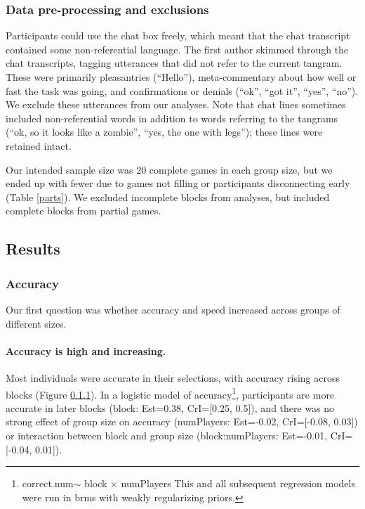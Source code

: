 \documentclass[
  english,
  a4paper,
]{article}
\begin{document}
\hypertarget{data-pre-processing-and-exclusions}{%
\subsubsection{Data pre-processing and exclusions}\label{data-pre-processing-and-exclusions}}

Participants could use the chat box freely, which meant that the chat transcript contained some non-referential language. The first author skimmed through the chat transcripts, tagging utterances that did not refer to the current tangram. These were primarily pleasantries (``Hello''), meta-commentary about how well or fast the task was going, and confirmations or denials (``ok'', ``got it'', ``yes'', ``no''). We exclude these utterances from our analyses. Note that chat lines sometimes included non-referential words in addition to words referring to the tangrams (``ok, so it looks like a zombie'', ``yes, the one with legs''); these lines were retained intact.

Our intended sample size was 20 complete games in each group size, but we ended up with fewer due to games not filling or participants disconnecting early (Table \ref{parts}). We excluded incomplete blocks from analyses, but included complete blocks from partial games.

\hypertarget{results}{%
\subsection{Results}\label{results}}

\hypertarget{accuracy}{%
\subsubsection{Accuracy}\label{accuracy}}

Our first question was whether accuracy and speed increased across groups of different sizes.

\hypertarget{accuracy-is-high-and-increasing.}{%
\paragraph{Accuracy is high and increasing.}\label{accuracy-is-high-and-increasing.}}

Most individuals were accurate in their selections, with accuracy rising across blocks (Figure \ref{accuracy}). In a logistic model of accuracy\footnote{correct.num\(\sim\) block \(\times\) numPlayers This and all subsequent regression models were run in brms with weakly regularizing priors.}, participants are more accurate in later blocks (block: Est=0.38, CrI={[}0.25, 0.5{]}), and there was no strong effect of group size on accuracy (numPlayers: Est=-0.02, CrI={[}-0.08, 0.03{]}) or interaction between block and group size (block:numPlayers: Est=-0.01, CrI={[}-0.04, 0.01{]}).
\end{document}
